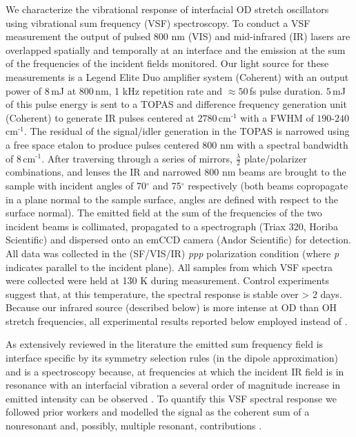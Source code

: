 \documentclass[twoside,twocolumn,9pt]{article}
\begin{document}
We characterize the vibrational response of interfacial OD stretch oscillators using vibrational sum frequency (VSF) spectroscopy. To conduct a VSF measurement the output of pulsed 800 nm (VIS) and mid-infrared (IR) lasers are overlapped spatially and temporally at an interface and the emission at the sum of the frequencies of the incident fields monitored. Our light source for these measurements is a Legend Elite Duo amplifier system (Coherent) with an output power of $8\,$mJ at $800\,$nm, 1 kHz repetition rate and $\approx50\,$fs pulse duration. $5\,$mJ of this pulse energy is sent to a TOPAS and difference frequency generation unit (Coherent) to generate IR pulses centered at $2780\,$cm$^{\text{-1}}$ with a FWHM of $190$-$240\,$cm$^{\text{-1}}$. The residual of the signal/idler generation in the TOPAS is narrowed using a free space etalon to produce pulses centered 800 nm with a spectral bandwidth of $8\,$cm$^{\text{-1}}$. After traversing through a series of mirrors, $\frac{\lambda}{2}$ plate/polarizer combinations, and lenses the IR and narrowed 800 nm beams are brought to the sample with incident angles of 70$^\circ$ and 75$^\circ$ respectively (both beams copropagate in a plane normal to the sample surface, angles are defined with respect to the surface normal).  The emitted field at the sum of the frequencies of the two incident beams is collimated, propagated to a spectrograph (Triax 320, Horiba Scientific) and dispersed onto an emCCD camera (Andor Scientific) for detection. All data was collected in the (SF/VIS/IR) \textit{ppp} polarization condition (where \textit{p} indicates parallel to the incident plane). All samples from which VSF spectra were collected were held at 130 K during measurement. Control experiments suggest that, at this temperature, the spectral response is stable over > 2 days. Because our infrared source (described below) is more intense at OD than OH stretch frequencies, all experimental results reported below employed  instead of .

As extensively reviewed in the literature the emitted sum frequency field is interface specific by its symmetry selection rules (in the dipole approximation) and is a spectroscopy because, at frequencies at which the incident IR field is in resonance with an interfacial vibration a several order of magnitude increase in emitted intensity can be observed \cite{lam05}. To quantify this VSF spectral response we followed prior workers and modelled the signal as the coherent sum of a nonresonant and, possibly, multiple resonant, contributions  \cite{bain91}. 
\end{document}
